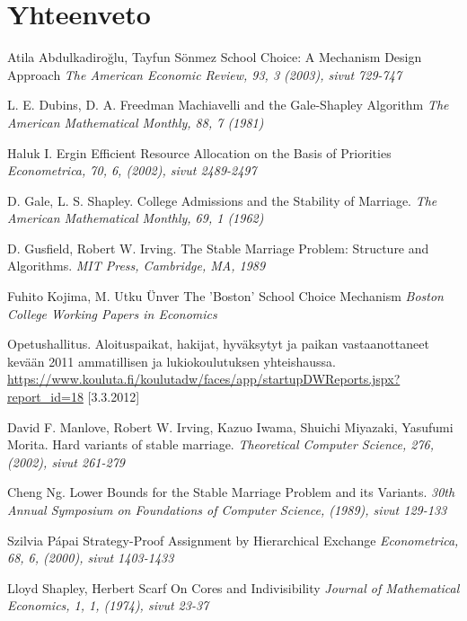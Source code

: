 \documentclass[gradu, twoside]{tktltiki}
\begin{document}
\section{Yhteenveto}

\newpage
\begin{thebibliography}{XXX99}

  Atila Abdulkadiroğlu, Tayfun Sönmez
  School Choice: A Mechanism Design Approach
  \emph{The American Economic Review, 93, 3 (2003), sivut 729-747}

  L. E. Dubins, D. A. Freedman
  Machiavelli and the Gale-Shapley Algorithm
  \emph{The American Mathematical Monthly, 88, 7 (1981)}

  Haluk I. Ergin
  Efficient Resource Allocation on the Basis of Priorities
  \emph{Econometrica, 70, 6, (2002), sivut 2489-2497}

  D. Gale, L. S. Shapley.
  College Admissions and the Stability of Marriage.
  \emph{The American Mathematical Monthly, 69, 1 (1962)}

  D. Gusfield, Robert W. Irving.
  The Stable Marriage Problem: Structure and Algorithms.
  \emph{MIT Press, Cambridge, MA, 1989}

  Fuhito Kojima, M. Utku Ünver
  The 'Boston' School Choice Mechanism
  \emph{Boston College Working Papers in Economics}

  Opetushallitus.
  Aloituspaikat, hakijat, hyväksytyt ja paikan vastaanottaneet
  kevään 2011 ammatillisen ja lukiokoulutuksen yhteishaussa.
  \url{https://www.kouluta.fi/koulutadw/faces/app/startupDWReports.jspx?report_id=18}
      [3.3.2012]

  David F. Manlove, Robert W. Irving, Kazuo Iwama, Shuichi Miyazaki,
  Yasufumi Morita.
  Hard variants of stable marriage.
  \emph{Theoretical Computer Science, 276, (2002), sivut 261-279}

  Cheng Ng.
  Lower Bounds for the Stable Marriage Problem and its Variants.
  \emph{30th Annual Symposium on Foundations of Computer Science,
    (1989), sivut 129-133}

  Szilvia Pápai
  Strategy-Proof Assignment by Hierarchical Exchange
  \emph{Econometrica, 68, 6, (2000), sivut 1403-1433}

  Lloyd Shapley, Herbert Scarf
  On Cores and Indivisibility
  \emph{Journal of Mathematical Economics, 1, 1, (1974), sivut 23-37}

\end{thebibliography}
\end{document}
